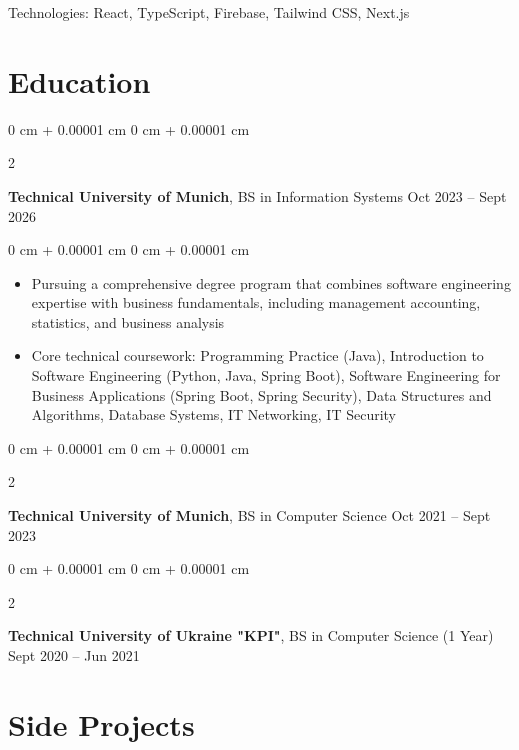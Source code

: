 \documentclass[10pt, letterpaper]{article}
\newenvironment{highlights}{
    \begin{itemize}[
        topsep=0.10 cm,
        parsep=0.10 cm,
        partopsep=0pt,
        itemsep=0pt,
        leftmargin=0 cm + 10pt
    ]
}{
    \end{itemize}
} %
\newenvironment{onecolentry}{
    \begin{adjustwidth}{
        0 cm + 0.00001 cm
    }{
        0 cm + 0.00001 cm
    }
}{
    \end{adjustwidth}
} %
\newenvironment{twocolentry}[2][]{
    \onecolentry
    \def\secondColumn{#2}
    \setcolumnwidth{\fill, 4.5 cm}
    \begin{paracol}{2}
}{
    \switchcolumn \raggedleft \secondColumn
    \end{paracol}
    \endonecolentry
} %
\begin{document}
    \vspace{0.20 cm}
    Technologies: React, TypeScript, Firebase, Tailwind CSS, Next.js



    \section{Education}

        \begin{twocolentry}{
            Oct 2023 – Sept 2026
        }
            \textbf{Technical University of Munich}, BS in Information Systems\end{twocolentry}

        \vspace{0.10 cm}
        \begin{onecolentry}
            \begin{highlights}
                \item Pursuing a comprehensive degree program that combines software engineering expertise with business fundamentals, including management accounting, statistics, and business analysis
                \item Core technical coursework: Programming Practice (Java), Introduction to Software Engineering (Python, Java, Spring Boot), Software Engineering for Business Applications (Spring Boot, Spring Security), Data Structures and Algorithms, Database Systems, IT Networking, IT Security
            \end{highlights}
        \end{onecolentry}

        \vspace{0.20 cm}

        \begin{twocolentry}{
            Oct 2021 – Sept 2023
        }
            \textbf{Technical University of Munich}, BS in Computer Science\end{twocolentry}
        
        \vspace{0.20 cm}

        \begin{twocolentry}{
            Sept 2020 – Jun 2021
        }
            \textbf{Technical University of Ukraine "KPI"}, BS in Computer Science (1 Year)\end{twocolentry}
    
    \section{Side Projects}
        
\end{document}
